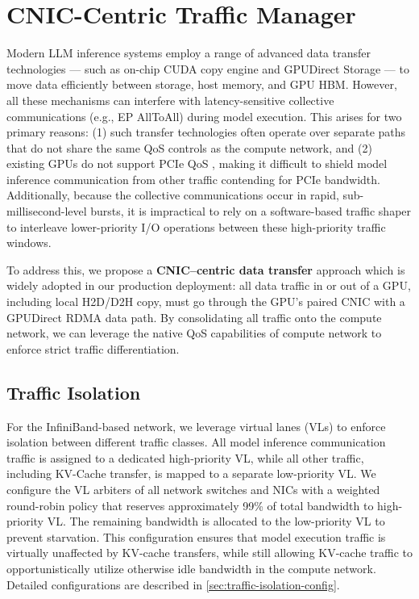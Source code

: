 
\section{CNIC-Centric Traffic Manager}
\label{sec:traffic-manager}

Modern LLM inference systems employ a range of advanced data transfer technologies --- such as on-chip CUDA copy engine and GPUDirect Storage \cite{nvidia2026gds} --- to move data efficiently between storage, host memory, and GPU HBM. However, all these mechanisms can interfere with latency-sensitive collective communications (e.g., EP AllToAll) during model execution. This arises for two primary reasons: (1) such transfer technologies often operate over separate paths that do not share the same QoS controls as the compute network, and (2) existing GPUs do not support PCIe QoS \cite{7723586}, making it difficult to shield model inference communication from other traffic contending for PCIe bandwidth. Additionally, because the collective communications occur in rapid, sub-millisecond-level bursts, it is impractical to rely on a software-based traffic shaper to interleave lower-priority I/O operations between these high-priority traffic windows.


To address this, we propose a \textbf{CNIC--centric data transfer} approach which is widely adopted in our production deployment: all data traffic in or out of a GPU, including local H2D/D2H copy, must go through the GPU's paired CNIC with a GPUDirect RDMA \cite{nvidiaOverviewx2014} data path. By consolidating all traffic onto the compute network, we can leverage the native QoS capabilities of compute network to enforce strict traffic differentiation.

\subsection{Traffic Isolation}

For the InfiniBand-based network, we leverage virtual lanes (VLs) \cite{ibta-spec} to enforce isolation between different traffic classes. 
All model inference communication traffic is assigned to a dedicated high-priority VL, while all other traffic, including KV-Cache transfer, is mapped to a separate low-priority VL.
We configure the VL arbiters of all network switches and NICs with a weighted round-robin policy that reserves approximately 99\% of total bandwidth to high-priority VL.
The remaining bandwidth is allocated to the low-priority VL to prevent starvation.
This configuration ensures that model execution traffic is virtually unaffected by KV-cache transfers, while still allowing KV-cache traffic to opportunistically utilize otherwise idle bandwidth in the compute network.
Detailed configurations are described in \autoref{sec:traffic-isolation-config}.


